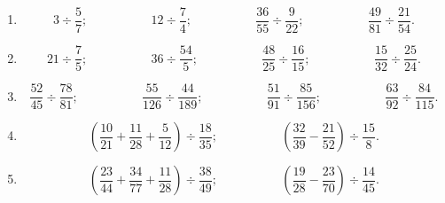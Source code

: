 \documentclass[12 pt]{extarticle}
\theoremstyle{plain}
\begin{document}
 \begin{enumerate}
 \item \[ 3 \div \frac57;\phantom{meowmeow}
 12\div \frac74 ; \phantom{meowmeow}
 \frac{36}{55}\div\frac{9}{22}; \phantom{meowmeow}
 \frac{49}{81}\div \frac{21}{54}.\]
 
  \item \[ 21 \div \frac75;\phantom{meowmeow}
 36\div \frac{54}5 ; \phantom{meowmeow}
 \frac{48}{25}\div\frac{16}{15}; \phantom{meowmeow}
 \frac{15}{32}\div \frac{25}{24}.\]
 
  \item \[ \frac{52}{45} \div \frac{78}{81};\phantom{meowmeow}
 \frac{55}{126}\div\frac{44}{189} ; \phantom{meowmeow}
 \frac{51}{91}\div\frac{85}{156}; \phantom{meowmeow}
 \frac{63}{92}\div \frac{84}{115}.\]
 
 \item \[ \left( \frac{10}{21} +\frac{11}{28} + \frac5{12} \right) \div \frac{18}{35} ;
 \phantom{meowmeow}
 \left( \frac{32}{39} - \frac{21}{52} \right) \div \frac{15}{8}. \]
 
 \item \[ \left( \frac{23}{44} +\frac{34}{77} + \frac{11}{28} \right) \div \frac{38}{49};
 \phantom{meowmeow}
 \left( \frac{19}{28} - \frac{23}{70} \right) \div \frac{14}{45}. \]
 

\end{enumerate}
\end{document}
